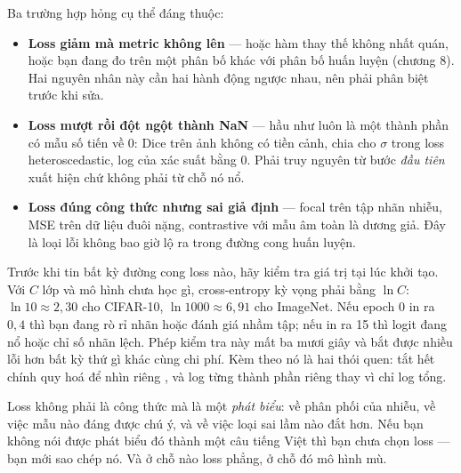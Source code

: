 \documentclass[../../deep_learning.tex]{subfiles}
\begin{document}
Ba trường hợp hỏng cụ thể đáng thuộc:

\begin{itemize}
\item \textbf{Loss giảm mà metric không lên} --- hoặc hàm thay thế không nhất quán, hoặc bạn đang đo trên một phân bố khác với phân bố huấn luyện (chương 8). Hai nguyên nhân này cần hai hành động ngược nhau, nên phải phân biệt trước khi sửa.
\item \textbf{Loss mượt rồi đột ngột thành NaN} --- hầu như luôn là một thành phần có mẫu số tiến về 0: Dice trên ảnh không có tiền cảnh, chia cho \(\sigma\) trong loss heteroscedastic, log của xác suất bằng 0. Phải truy nguyên từ bước \emph{đầu tiên} xuất hiện chứ không phải từ chỗ nó nổ.
\item \textbf{Loss đúng công thức nhưng sai giả định} --- focal trên tập nhãn nhiễu, MSE trên dữ liệu đuôi nặng, contrastive với mẫu âm toàn là dương giả. Đây là loại lỗi không bao giờ lộ ra trong đường cong huấn luyện.
\end{itemize}

\begin{cambay}
Trước khi tin bất kỳ đường cong loss nào, hãy kiểm tra giá trị tại lúc khởi tạo. Với \(C\) lớp và mô hình chưa học gì, cross-entropy kỳ vọng phải bằng \(\ln C\): \(\ln 10 \approx 2{,}30\) cho CIFAR-10, \(\ln 1000 \approx 6{,}91\) cho ImageNet. Nếu epoch 0 in ra \(0{,}4\) thì bạn đang rò rỉ nhãn hoặc đánh giá nhầm tập; nếu in ra 15 thì logit đang nổ hoặc chỉ số nhãn lệch. Phép kiểm tra này mất ba mươi giây và bắt được nhiều lỗi hơn bất kỳ thứ gì khác cùng chi phí. Kèm theo nó là hai thói quen: tắt hết chính quy hoá để nhìn riêng , và log từng thành phần riêng thay vì chỉ log tổng.
\end{cambay}

\begin{cannho}
Loss không phải là công thức mà là một \emph{phát biểu}: về phân phối của nhiễu, về việc mẫu nào đáng được chú ý, và về việc loại sai lầm nào đắt hơn. Nếu bạn không nói được phát biểu đó thành một câu tiếng Việt thì bạn chưa chọn loss --- bạn mới sao chép nó. Và ở chỗ nào loss phẳng, ở chỗ đó mô hình mù. 
\end{cannho}
\end{document}
